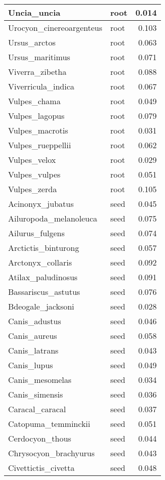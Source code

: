 \begin{table}
\begin{tabular}[t]{l|l|r}
\hline
Uncia\_uncia & root & 0.014\\
\hline
Urocyon\_cinereoargenteus & root & 0.103\\
\hline
Ursus\_arctos & root & 0.063\\
\hline
Ursus\_maritimus & root & 0.071\\
\hline
Viverra\_zibetha & root & 0.088\\
\hline
Viverricula\_indica & root & 0.067\\
\hline
Vulpes\_chama & root & 0.049\\
\hline
Vulpes\_lagopus & root & 0.079\\
\hline
Vulpes\_macrotis & root & 0.031\\
\hline
Vulpes\_rueppellii & root & 0.062\\
\hline
Vulpes\_velox & root & 0.029\\
\hline
Vulpes\_vulpes & root & 0.051\\
\hline
Vulpes\_zerda & root & 0.105\\
\hline
Acinonyx\_jubatus & seed & 0.045\\
\hline
Ailuropoda\_melanoleuca & seed & 0.075\\
\hline
Ailurus\_fulgens & seed & 0.074\\
\hline
Arctictis\_binturong & seed & 0.057\\
\hline
Arctonyx\_collaris & seed & 0.092\\
\hline
Atilax\_paludinosus & seed & 0.091\\
\hline
Bassariscus\_astutus & seed & 0.076\\
\hline
Bdeogale\_jacksoni & seed & 0.028\\
\hline
Canis\_adustus & seed & 0.046\\
\hline
Canis\_aureus & seed & 0.058\\
\hline
Canis\_latrans & seed & 0.043\\
\hline
Canis\_lupus & seed & 0.049\\
\hline
Canis\_mesomelas & seed & 0.034\\
\hline
Canis\_simensis & seed & 0.036\\
\hline
Caracal\_caracal & seed & 0.037\\
\hline
Catopuma\_temminckii & seed & 0.051\\
\hline
Cerdocyon\_thous & seed & 0.044\\
\hline
Chrysocyon\_brachyurus & seed & 0.043\\
\hline
Civettictis\_civetta & seed & 0.048\\

\end{tabular}
\end{table}
